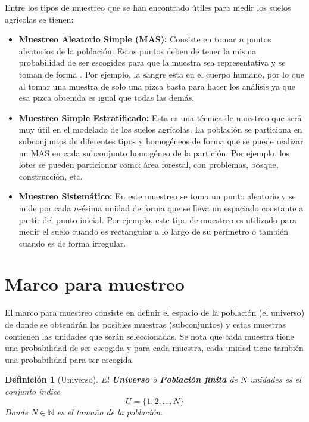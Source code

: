 \documentclass{report}
\newtheorem{definition}{Definición}
\begin{document}
\bigbreak

Entre los tipos de muestreo que se han encontrado útiles para medir los suelos agrícolas se tienen:

\begin{itemize}
    \item \textbf{Muestreo Aleatorio Simple (MAS):} Consiste en tomar $n$ puntos aleatorios de la población. Estos puntos deben de tener la misma probabilidad de ser escogidos para que la muestra sea representativa y se toman de forma . Por ejemplo, la sangre esta  en el cuerpo humano, por lo que al tomar una muestra de solo una pizca basta para hacer los análisis ya que esa pizca obtenida es igual que todas las demás.
    
    \item \textbf{Muestreo Simple Estratificado:} Esta es una técnica de muestreo que será muy útil en el modelado de los suelos agrícolas. La población se particiona en subconjuntos de diferentes tipos y homogéneos de forma que se puede realizar un MAS en cada subconjunto homogéneo de la partición. Por ejemplo, los lotes se pueden particionar como: área forestal, con problemas, bosque, construcción, etc.
    
    \item \textbf{Muestreo Sistemático:} En este muestreo se toma un punto aleatorio y se mide por cada $n$-ésima unidad de forma que se lleva un espaciado constante a partir del punto inicial. Por ejemplo, este tipo de muestreo es utilizado para medir el suelo cuando es rectangular a lo largo de su perímetro o también cuando es de forma irregular.
\end{itemize}

\section{Marco para muestreo}

El marco para muestreo \cite{lohr-2009} consiste en definir el espacio de la población (el universo) de donde se obtendrán las posibles muestras (subconjuntos) y estas muestras contienen las unidades que serán seleccionadas. Se nota que cada muestra tiene una probabilidad de ser escogida y para cada muestra, cada unidad tiene también una probabilidad para ser escogida.

\begin{definition}[Universo]
    El \textbf{Universo} o \textbf{Población finita} de $N$ unidades es el conjunto índice
    $$
    U = \{ 1, 2, ..., N \}
    $$
    Donde $N \in \mathbb{N}$ es el tamaño de la población.
\end{definition}
\end{document}
